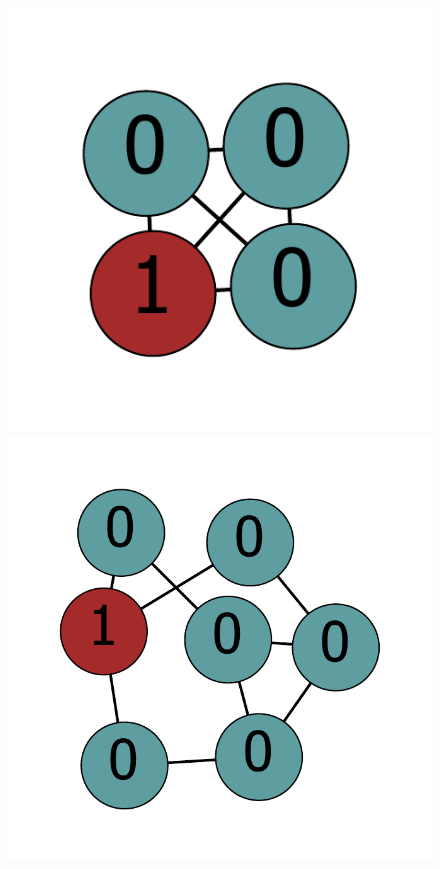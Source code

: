 \documentclass[12pt]{article}
\theoremstyle{plain}
\theoremstyle{definition}
\theoremstyle{remark}
\begin{document}
\begin{figure}[!htb]
	\centering
	\includegraphics[scale=0.35]{pictures/111111[1,0,0,0].pdf}
	\includegraphics[scale=0.35]{pictures/001101001100011010010[0,0,0,0,0,1,0].pdf}

\end{figure}
\end{document}
